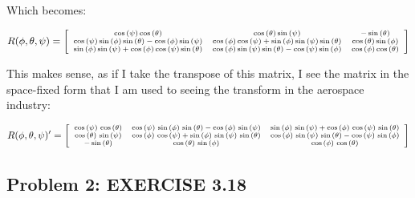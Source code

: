 \documentclass[12pt, letterpaper]{../assignment}
\begin{document}
Which becomes:

\begin{answer}
$$ \scriptsize R(\phi,\theta,\psi) = \left[\begin{array}{ccc} 
    \cos\left(\psi \right)\cos\left(\theta \right) &
    \cos\left(\theta \right)\sin\left(\psi \right) &
    -\sin\left(\theta \right)\\
    \cos\left(\psi \right)\sin\left(\phi \right)\sin\left(\theta \right)-\cos\left(\phi \right)\sin\left(\psi \right) & 
    \cos\left(\phi \right)\cos\left(\psi \right)+\sin\left(\phi \right)\sin\left(\psi \right)\sin\left(\theta \right) & 
    \cos\left(\theta \right)\sin\left(\phi \right)\\
    \sin\left(\phi \right)\sin\left(\psi \right)+\cos\left(\phi \right)\cos\left(\psi \right)\sin\left(\theta \right) &
    \cos\left(\phi \right)\sin\left(\psi \right)\sin\left(\theta \right)-\cos\left(\psi \right)\sin\left(\phi \right) &
    \cos\left(\phi \right)\cos\left(\theta \right)
\end{array}\right] $$
\end{answer}

This makes sense,
as if I take the transpose of this matrix,
I see the matrix in the space-fixed form that I am used to seeing the transform in the aerospace industry:

$$ \scriptsize R(\phi,\theta,\psi)' = \left[\begin{array}{ccc}
    \cos\left(\psi \right)\,\cos\left(\theta \right) &
    \cos\left(\psi \right)\,\sin\left(\phi \right)\,\sin\left(\theta \right)-\cos\left(\phi \right)\,\sin\left(\psi \right) &
    \sin\left(\phi \right)\,\sin\left(\psi \right)+\cos\left(\phi \right)\,\cos\left(\psi \right)\,\sin\left(\theta \right)\\
    \cos\left(\theta \right)\,\sin\left(\psi \right) &
    \cos\left(\phi \right)\,\cos\left(\psi \right)+\sin\left(\phi \right)\,\sin\left(\psi \right)\,\sin\left(\theta \right) &
    \cos\left(\phi \right)\,\sin\left(\psi \right)\,\sin\left(\theta \right)-\cos\left(\psi \right)\,\sin\left(\phi \right)\\
    -\sin\left(\theta \right) &
    \cos\left(\theta \right)\,\sin\left(\phi \right) &
    \cos\left(\phi \right)\,\cos\left(\theta \right)
\end{array}\right] $$

\subsection*{Problem 2: EXERCISE 3.18}
\end{document}
